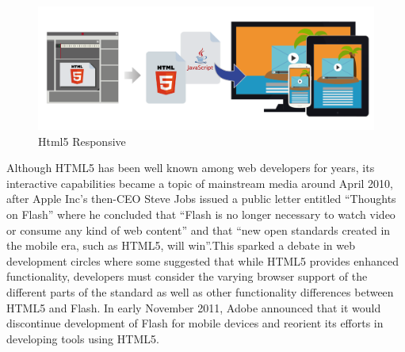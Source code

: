 \begin{figure}[htb]
 \centering
 \includegraphics[width=1.0\linewidth]{images/chapter2/Html5_responsive.png}\hfill
 \caption[Html5 Responsive]{Html5 Responsive}
 \label{fig:fourV}
\end{figure}
Although HTML5 has been well known among web developers for years, its interactive capabilities became a topic of mainstream media around April 2010, after Apple Inc’s then-CEO Steve Jobs issued a public letter entitled “Thoughts on Flash”  where he concluded that “Flash is no longer necessary to watch video or consume any kind of web content” and that “new open standards created in the mobile era, such as HTML5, will win”.This sparked a debate in web development circles where some suggested that while HTML5 provides enhanced functionality, developers must consider the varying browser support of the different parts of the standard as well as other functionality differences between HTML5 and Flash. In early November 2011, Adobe announced that it would discontinue development of Flash for mobile devices and reorient its efforts in developing tools using HTML5.
